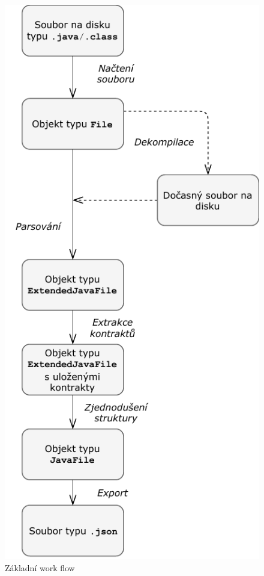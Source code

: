 				\begin{figure}[!htb]
						\centering
						\includegraphics{img/workFlow.pdf}
						\caption[workFlow]{Základní work flow}
						\label{workFlow}
					\endminipage\hfill
				\end{figure}
				
